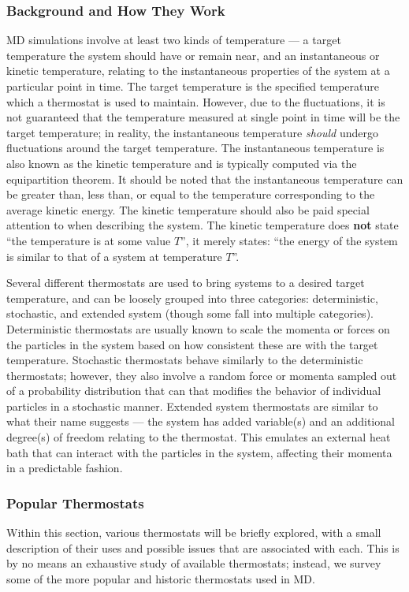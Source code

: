 \documentclass[9pt,bestpractices]{livecoms}
\begin{document}
\subsubsection{Background and How They Work}
MD simulations involve at least two kinds of temperature --- a target temperature the system should have or remain near, and an instantaneous or kinetic temperature, relating to the instantaneous properties of the system at a particular point in time.
The target temperature is the specified temperature which a thermostat is used to maintain.
However, due to the fluctuations, it is not guaranteed that the temperature measured at single point in time will be the target temperature; in reality, the instantaneous temperature \emph{should} undergo fluctuations around the target temperature.
The instantaneous temperature is also known as the kinetic temperature and is typically computed via the equipartition theorem.
It should be noted that the instantaneous temperature can be greater than, less than, or equal to the temperature corresponding to the average kinetic energy.
The kinetic temperature should also be paid special attention to when describing the system.
The kinetic temperature does \textbf{not} state ``the temperature is at some value $T$'', it merely states: ``the energy of the system is similar to that
of a system at temperature $T$''.

Several different thermostats are used to bring systems to a desired target temperature, and can be loosely grouped into three categories: deterministic, stochastic, and extended system (though some fall into multiple categories).
Deterministic thermostats are usually known to scale the momenta or forces on the particles in the system based on how consistent these are with the target temperature.
Stochastic thermostats behave similarly to the deterministic thermostats; however, they also involve a random force or momenta sampled out of a probability distribution that can that modifies the behavior of individual particles in a stochastic manner.
Extended system thermostats are similar to what their name suggests --- the system has added variable(s) and an additional degree(s) of freedom relating to the thermostat.
This emulates an external heat bath that can interact with the particles in the system, affecting their momenta in a predictable fashion.

\subsubsection{Popular Thermostats}
Within this section, various thermostats will be briefly explored, with a small description of their uses and possible issues that are associated with each.
This is by no means an exhaustive study of available thermostats; instead, we survey some of the more popular and historic thermostats used in MD.
\end{document}
